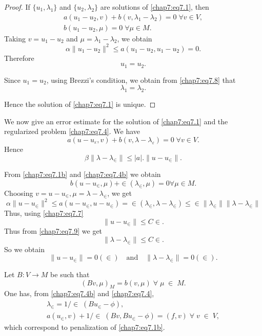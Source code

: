 \begin{proof}
If $\{u_1,\lambda_1\}$ and $\{u_2,\lambda_2\}$ are solutions of
\eqref{chap7:eq7.1}, then 
\begin{equation}\label{chap7:eq7.8}
\begin{split}
a(u_1-u_2,v)+b(v,\lambda_1-\lambda_2)=0 \; \forall v\in V,\\
b(u_1-u_2,\mu)=0 \; \forall\mu\in M.
\end{split}
\end{equation}
Taking $v=u_1-u_2$ and $\mu=\lambda_1-\lambda_2$, we obtain 
$$
\alpha\parallel u_1-u_2\parallel^2\leq a(u_1-u_2,u_1-u_2)=0.
$$
Therefore
$$
u_1=u_2.
$$

Since $u_1=u_2$, using Brezzi's condition, we obtain from
\eqref{chap7:eq7.8} that 
$$
\lambda_1=\lambda_2.
$$

Hence the solution of \eqref{chap7:eq7.1} is unique.
\end{proof}

\setcounter{REM}{0}
\begin{REM}\label{chap7:rem1}
We now give an error estimate for the solution of \eqref{chap7:eq7.1}
and the regularized problem \eqref{chap7:eq7.4}. We have 
$$
a(u-u_\varepsilon,v)+b(v,\lambda -\lambda_\varepsilon)=0 \; \forall
v\in V.
$$
Hence 
\begin{equation}\label{chap7:eq7.9}
\beta\parallel\lambda -\lambda_\in\parallel\leq |a|. \parallel
u-u_\in \parallel.
\end{equation}

From \eqref{chap7:eq7.1b} and \eqref{chap7:eq7.4b} we obtain
$$
b(u-u_\in,\mu)+\in(\lambda_\in,\mu)=0\forall
\mu\in M.
$$\pageoriginale
Choosing $v=u-u_\in,\mu=\lambda-\lambda_\in$, we get 
$$
\alpha\parallel u-u_\in\parallel^2\leq a(u-u_\in,
u-u_\in)=\in(\lambda_\in,\lambda-\lambda_\in)
\leq\in\parallel\lambda_\in\parallel \parallel\lambda
-\lambda_\in\parallel
$$
Thus, using \eqref{chap7:eq7.7}
$$
\parallel u-u_\in\parallel \leq C\in.
$$
Thus from \eqref{chap7:eq7.9} we get 
$$
\parallel\lambda-\lambda_\in\parallel\leq C\in.
$$
So we obtain
$$
\parallel u-u_\in\parallel=0(\in)\quad\text{and}\quad
\parallel\lambda-\lambda_\in\parallel=0(\in).
$$
\end{REM}

\begin{REM}\label{chap7:rem2}
Let $B:V\to M$ be such that 
$$
(Bv,\mu)_M=b(v,\mu)\;\forall\;\mu\;\in\; M.
$$
One has, from \eqref{chap7:eq7.4b} and \eqref{chap7:eq7.4},
\begin{gather*}
\lambda_\in= 1/\in\;(Bu_\in-\phi),\\
a(u_\in,v)+1/\in\;(Bv, Bu_\in-\phi)=
(f,v)\;\forall\;v\;\in \;V,
\end{gather*}
which correspond to penalization of \eqref{chap7:eq7.1b}.
\end{REM}

